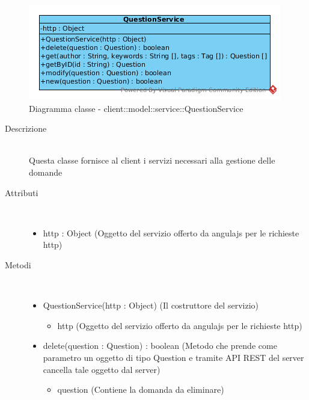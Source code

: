 \vspace{0.5cm}
\hypertarget{client::model::service::QuestionService}{}
\begin{center}
			\begin{figure}[H]
				\centering \includegraphics[scale=4, max width=\textwidth, max height=\myheight]{../img/diagrammiClassi/client/model/service/QuestionService.png}
				\caption{Diagramma classe - client::model::service::QuestionService}
			\end{figure}
		\end{center}\begin{description}
\item[Descrizione] \hfill \\
 Questa classe fornisce al client i servizi necessari alla gestione delle domande
\item[Attributi] \hfill \\
 \vspace{-7mm}
\begin{itemize}
\item http : Object (Oggetto del servizio offerto da angulajs per le richieste http)
\end{itemize}

\item[Metodi] \hfill \\
 \vspace{-7mm}
\begin{itemize}
\item QuestionService(http : Object) (Il costruttore del servizio)\begin{itemize}
\item http (Oggetto del servizio offerto da angulajs per le richieste http)
\end{itemize}

\item delete(question : Question) : boolean (Metodo che prende come parametro un oggetto di tipo Question e tramite API REST del server cancella tale oggetto dal server)\begin{itemize}
\item question (Contiene la domanda da eliminare)
\end{itemize}


\end{itemize}
\end{description}
